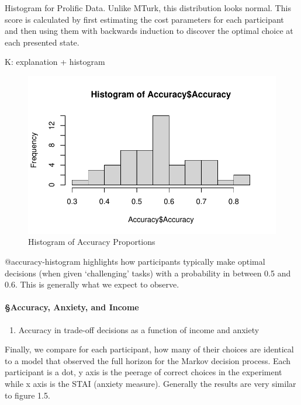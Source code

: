 Histogram for Prolific Data. Unlike MTurk, this distribution looks
normal. This score is calculated by first estimating the cost parameters
for each participant and then using them with backwards induction to
discover the optimal choice at each presented state.

K: explanation + histogram

\begin{figure}

{\centering \includegraphics{thesis-file-ppq_files/figure-latex/accuracy-histogram-1.pdf}

}

\caption{Histogram of Accuracy Proportions}

\end{figure}

@accuracy-histogram highlights how participants typically make optimal
decisions (when given `challenging' tasks) with a probability in between
0.5 and 0.6. This is generally what we expect to observe.

\hypertarget{accuracy-anxiety-and-income}{%
\paragraph{§Accuracy, Anxiety, and
Income}\label{accuracy-anxiety-and-income}}

\begin{enumerate}
\def\labelenumi{\arabic{enumi}.}
\tightlist
\item
  Accuracy in trade-off decisions as a function of income and anxiety
\end{enumerate}

Finally, we compare for each participant, how many of their choices are
identical to a model that observed the full horizon for the Markov
decision process. Each participant is a dot, y axis is the peerage of
correct choices in the experiment while x axis is the STAI (anxiety
measure). Generally the results are very similar to figure 1.5.

